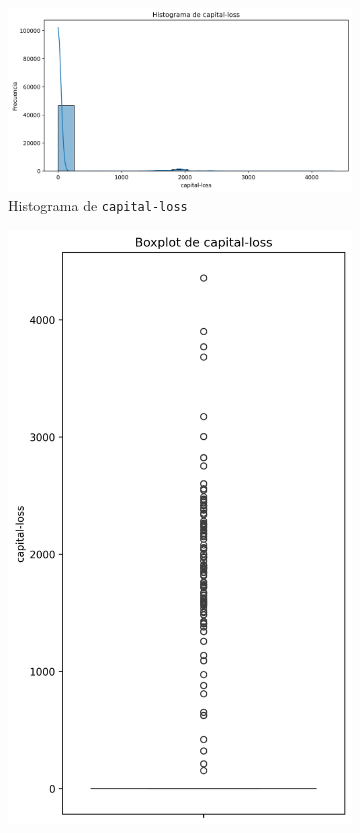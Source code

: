 \documentclass[12pt,a4paper]{article}
\begin{document}
\begin{enumerate}
    \begin{figure}[H]
      \centering
      \begin{subfigure}[b]{0.45\textwidth}
        \includegraphics[width=\textwidth]{histogram_capital-loss.png}
        \caption{Histograma de \texttt{capital-loss}}
        \label{fig:capital_loss_hist}
      \end{subfigure}
      \hfill
      \begin{subfigure}[b]{0.45\textwidth}
        \includegraphics[width=\textwidth]{boxplot_capital-loss.png}

\end{subfigure}
\end{figure}
\end{enumerate}
\end{document}
